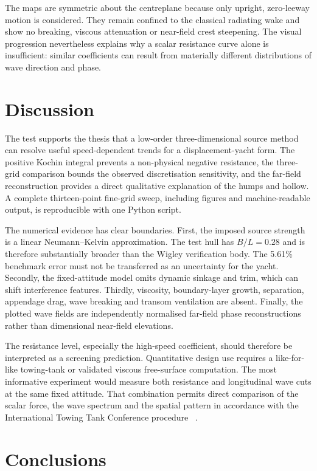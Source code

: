 \documentclass{jfm}
\begin{document}
The maps are symmetric about the centreplane because only upright, zero-leeway
motion is considered. They remain confined to the classical radiating wake and
show no breaking, viscous attenuation or near-field crest steepening. The
visual progression nevertheless explains why a scalar resistance curve alone
is insufficient: similar coefficients can result from materially different
distributions of wave direction and phase.

\section{Discussion}\label{sec:discussion}

The test supports the thesis that a low-order three-dimensional source method
can resolve useful speed-dependent trends for a displacement-yacht form. The
positive Kochin integral prevents a non-physical negative resistance, the
three-grid comparison bounds the observed discretisation sensitivity, and the
far-field reconstruction provides a direct qualitative explanation of the
humps and hollow. A complete thirteen-point fine-grid sweep, including figures
and machine-readable output, is reproducible with one Python script.

The numerical evidence has clear boundaries. First, the imposed source
strength is a linear Neumann--Kelvin approximation. The test hull has
$B/L=0.28$ and is therefore substantially broader than the Wigley verification
body. The 5.61\% benchmark error must not be transferred as an uncertainty for
the yacht. Secondly, the fixed-attitude model omits dynamic sinkage and trim,
which can shift interference features. Thirdly, viscosity, boundary-layer
growth, separation, appendage drag, wave breaking and transom ventilation are
absent. Finally, the plotted wave fields are independently normalised
far-field phase reconstructions rather than dimensional near-field elevations.

The resistance level, especially the high-speed coefficient, should therefore
be interpreted as a screening prediction. Quantitative design use requires a
like-for-like towing-tank or validated viscous free-surface computation. The
most informative experiment would measure both resistance and longitudinal
wave cuts at the same fixed attitude. That combination permits direct
comparison of the scalar force, the wave spectrum and the spatial pattern in
accordance with the International Towing Tank Conference procedure
~\citep{ITTC2021}.

\section{Conclusions}\label{sec:conclusions}
\end{document}
